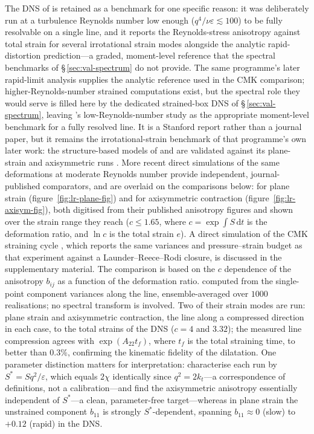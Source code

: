 \documentclass[lineno]{JFM-FLM_Au}
\begin{document}
The DNS of \citet{LeeReynolds1985} is retained as a benchmark for one
specific reason: it was deliberately run at a turbulence Reynolds number
low enough ($q^4/\nu\varepsilon\lesssim100$) to be fully resolvable on a
single line, and it reports the Reynolds-stress anisotropy against total
strain for several irrotational strain modes alongside the analytic
rapid-distortion prediction---a graded, moment-level reference that the
spectral benchmarks of \S\,\ref{sec:val-spectrum} do not provide. The
same programme's later rapid-limit analysis
\citep{LeePiomelliReynolds1986} supplies the analytic reference used in
the CMK comparison; higher-Reynolds-number strained
computations exist, but the spectral role they would serve is filled
here by the dedicated strained-box DNS of \S\,\ref{sec:val-spectrum},
leaving \citeauthor{LeeReynolds1985}'s low-Reynolds-number study as the
appropriate moment-level benchmark for a fully resolved line. It is a
Stanford report rather than a journal paper, but it remains the
irrotational-strain benchmark of that programme's own later work: the
structure-based models of \citet{ReynoldsKassinos1995} and
\citet{KassinosReynoldsRogers2001} are validated against its plane-strain
and axisymmetric runs \citep{KassinosReynolds1998}. More recent direct
simulations of the same deformations at moderate Reynolds number provide
independent, journal-published comparators, and are overlaid on the
comparisons below: \citet{ZusiPerot2013} for plane strain
(figure~\ref{fig:lr-plane-fig}) and \citet{ZusiPerot2014} for
axisymmetric contraction (figure~\ref{fig:lr-axisym-fig}), both digitised
from their published anisotropy figures and shown over the strain range
they reach ($c\le1.65$, where $c=\exp\int S\,\mathrm{d}t$ is the deformation ratio, and $\ln c$ is the total strain $e$). A direct simulation of the
CMK straining cycle
\citep{GualtieriMeneveau2010}, which reports the same variances and
pressure--strain budget as that experiment against a
Launder--Reece--Rodi closure, is discussed in the supplementary material.
The
comparison is based on the $c$ dependence of the anisotropy $b_{ij}$ as a function of the deformation
ratio. %
computed from the single-point component
variances along the line, ensemble-averaged over $1000$ realisations;
no spectral transform is involved. Two of their strain modes are run:
plane strain and axisymmetric contraction, the line along a compressed
direction in each case, to the total strains of the DNS ($c=4$ and
$3.32$); the measured line compression agrees with
$\exp(A_{22}t_f)$, where $t_f$ is the total straining time, to better than $0.3\%$, confirming the kinematic
fidelity of the dilatation. One parameter distinction matters for
interpretation: \citeauthor{LeeReynolds1985} characterise each run by
$S^{*}=Sq^2/\varepsilon$, which equals $2\chi$ identically since
$q^2=2k_t$---a correspondence of definitions, not a calibration---and
find the axisymmetric anisotropy
essentially independent of $S^{*}$---a clean, parameter-free
target---whereas in plane strain the unstrained component $b_{11}$ is
strongly $S^{*}$-dependent, spanning $b_{11}\approx0$ (slow) to
$+0.12$ (rapid) in the DNS.
\end{document}
